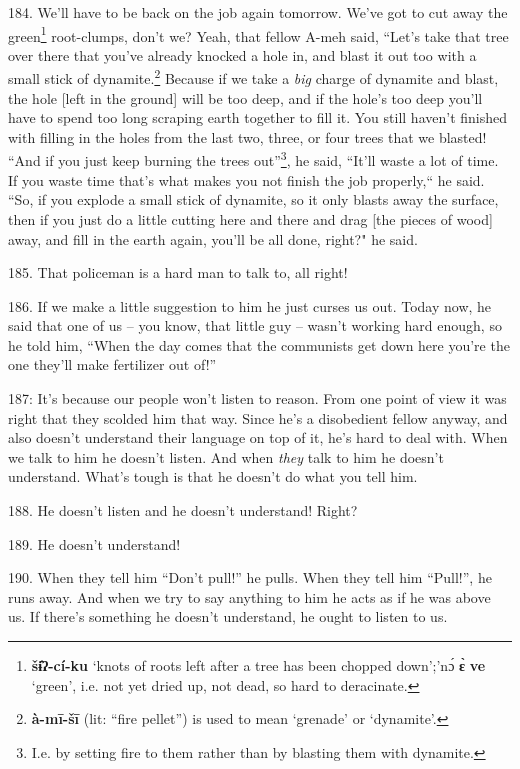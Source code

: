 184. We'll have to be back on the job again tomorrow. We've got to cut away the
green\footnote{\textbf{šɨ̂ʔ-cí-ku} `knots of roots left after a tree has been chopped down';'nɔ́ \textbf{ɛ̀} \textbf{ve} `green', i.e. not yet dried up, not dead, so hard to deracinate.} root-clumps, don't we? Yeah, that fellow A-meh said, ``Let's
take that tree over there that you've already knocked a hole in, and blast it out
too with a small stick of dynamite.\footnote{\textbf{à-mī-šī} (lit: ``fire pellet'') is used to mean `grenade' or `dynamite'.} Because if we take a \textit{big} charge
of dynamite and blast, the hole [left in the ground] will be too deep, and if the
hole's too deep you'll have to spend too long scraping earth together to fill it.
You still haven't finished with filling in the holes from the last two, three,
or four trees that we blasted! ``And if you just keep burning the trees
out''\footnote{I.e. by setting fire to them rather than by blasting them with dynamite.}, he said, ``It'll waste a lot of time. If you waste time that's
what makes you not finish the job properly,`` he said. ``So, if
you explode a small stick of dynamite, so it only blasts away the surface, then
if you just do a little cutting here and there and drag [the pieces of wood] away,
and fill in the earth again, you'll be all done, right?" he said.

185. That policeman is a hard man to talk to, all right!

186. If we make a little suggestion to him he just curses us out. Today now, he
said that one of us -- you know, that little guy -- wasn't working hard enough,
so he told him, ``When the day comes that the communists get down here you're the
one they'll make fertilizer out of!''

 187: It's because our people won't listen to reason.
From one point of view it was right that they scolded him that way. Since he's
a disobedient fellow anyway, and also doesn't understand their language on top
of it, he's hard to deal with. When we talk to him he doesn't listen. And when
\textit{they} talk to him he doesn't understand. What's tough is that he doesn't
do what you tell him.

188. He doesn't listen and he doesn't understand! Right?

189. He doesn't understand!

190. When they tell him ``Don't pull!'' he pulls. When they tell
him ``Pull!'', he runs away. And when we try to say anything to
him he acts as if he was above us. If there's something he doesn't understand,
he ought to listen to us.

